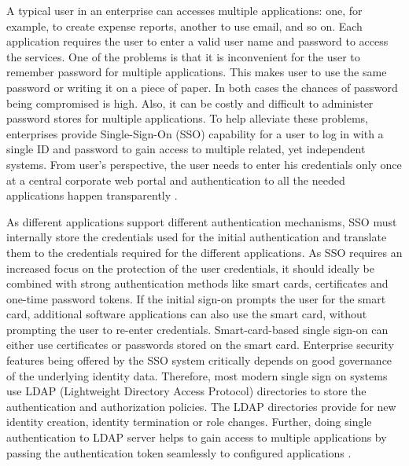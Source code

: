 \begin{multicols}{2}
A typical user in an enterprise can accesses multiple applications: one, for example, to create expense reports, another to use email, and so on. Each application requires the user to enter a valid user name and password to access the services. One of the problems is that it is inconvenient for the user to remember password for multiple applications. This makes user to use the same password or writing it on a piece of paper. In both cases the chances of password being compromised is high. Also, it can be costly and difficult to administer password stores for multiple applications. To help alleviate these problems, enterprises provide Single-Sign-On (SSO) capability for a user to log in with a single ID and password to gain access to multiple related, yet independent systems. From user's perspective, the user needs to enter his credentials only once at a central corporate web portal and authentication to all the needed applications happen transparently \cite{chap2-key19}.

As different applications support different authentication mechanisms, SSO must internally store the credentials used for the initial authentication and translate them to the credentials required for the different applications. As SSO requires an increased focus on the protection of the user credentials, it should ideally be combined with strong authentication methods like smart cards, certificates and one-time password tokens. If the initial sign-on prompts the user for the smart card, additional software applications can also use the smart card, without prompting the user to re-enter credentials. Smart-card-based single sign-on can either use certificates or passwords stored on the smart card. Enterprise security features being offered by the SSO system critically depends on good governance of the underlying identity data. Therefore, most modern single sign on systems use LDAP (Lightweight Directory Access Protocol) directories to store the authentication and authorization policies. The LDAP directories provide for new identity creation, identity termination or role changes. Further, doing single authentication to LDAP server helps to gain access to multiple applications by passing the authentication token seamlessly to configured applications \cite{chap2-key20}.


\end{multicols}
